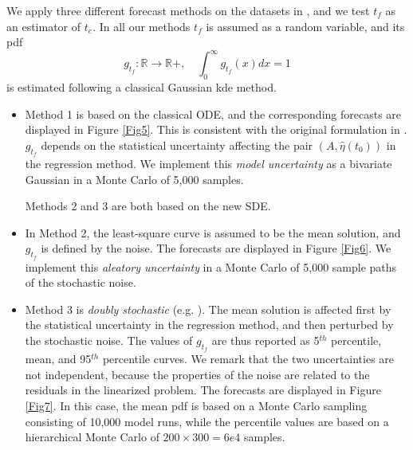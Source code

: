 \documentclass{article}
\begin{document}
We apply three different forecast methods on the datasets in \cite{Voight1988}, and we test $t_f$ as an estimator of $t_e$. In all our methods $t_f$ is assumed as a random variable, and its pdf
$$g_{t_f}:\mathbb R\rightarrow \mathbb R+,\quad \int_0^\infty g_{t_f}(x) dx=1$$
is estimated following a classical Gaussian kde method.

\begin{itemize}
\item Method 1 is based on the classical ODE, and the corresponding forecasts are displayed in Figure \ref{Fig5}. This is consistent with the original formulation in \cite{Voight1988}. $g_{t_f}$ depends on the statistical uncertainty affecting the pair $(A, \hat\eta(t_0))$ in the regression method. We implement this \emph{model uncertainty} as a bivariate Gaussian in a Monte Carlo of 5,000 samples.

Methods 2 and 3 are both based on the new SDE.
\item In Method 2, the least-square curve is assumed to be the mean solution, and $g_{t_f}$ is defined by the noise. The forecasts are displayed in Figure \ref{Fig6}. We implement this \emph{aleatory uncertainty} in a Monte Carlo of 5,000 sample paths of the stochastic noise.

\item Method 3 is \emph{doubly stochastic} (e.g. \cite{Bevilacqua2016}). The mean solution is affected first by the statistical uncertainty in the regression method, and then perturbed by the stochastic noise. The values of $g_{t_f}$ are thus reported as 5$^{th}$ percentile, mean, and 95$^{th}$ percentile curves. We remark that the two uncertainties are not independent, because the properties of the noise are related to the residuals in the linearized problem. The forecasts are displayed in Figure \ref{Fig7}. In this case, the mean pdf is based on a Monte Carlo sampling consisting of 10,000 model runs, while the percentile values are based on a hierarchical Monte Carlo of $200\times300=6e4$ samples.
\end{itemize}
\end{document}
